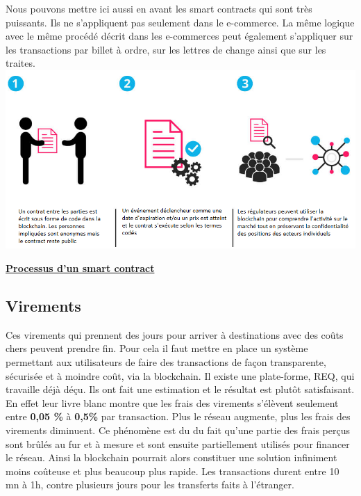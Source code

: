 \documentclass[12pt]{report}
\begin{document}
\hspace{1cm} Nous pouvons mettre ici aussi en avant les smart contracts qui sont très puissants. Ils ne s'appliquent pas seulement dans le e-commerce. La même logique avec le même procédé décrit dans les e-commerces peut également s'appliquer sur les transactions par billet à ordre, sur les lettres de change ainsi que sur les traites.\\

\includegraphics[width=1\textwidth]{contract_smart}
\begin{center}
   \textbf{\underline{Processus d'un smart contract}} \\[1cm]
\end{center}


    \subsection{Virements}
    
\hspace{1cm} Ces virements qui prennent des jours pour arriver à destinations avec des coûts chers peuvent prendre fin. Pour cela il faut mettre en place un système permettant aux utilisateurs  de faire des transactions de façon transparente, sécurisée et à moindre coût, via la blockchain. Il existe une plate-forme, REQ, qui travaille déjà déçu. Ils ont fait une estimation et le résultat est plutôt satisfaisant. En effet leur livre blanc montre que les frais des virements s'élèvent seulement  entre \textbf{0,05 \%} à \textbf{0,5\%} par transaction. Plus le réseau augmente, plus les frais des virements diminuent. Ce phénomène est du du fait qu'une partie des frais perçus sont brûlés au fur et à mesure et sont ensuite partiellement utilisés pour financer le réseau. Ainsi la blockchain pourrait alors constituer une solution infiniment moins coûteuse et plus beaucoup plus rapide. Les transactions durent entre 10 mn à 1h, contre plusieurs jours pour les transferts faits à l’étranger.\\
\end{document}
